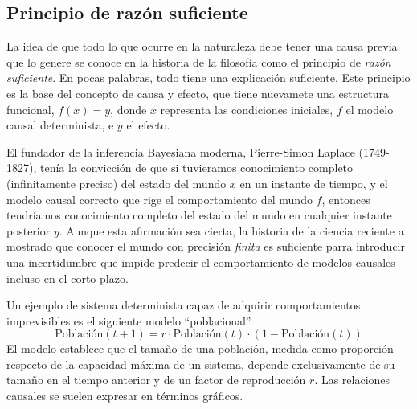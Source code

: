 \documentclass[a4paper,10pt]{book}
\theoremstyle{definition}
\begin{document}
\subsection{Principio de raz\'on suficiente}

La idea de que todo lo que ocurre en la naturaleza debe tener una causa previa que lo genere se conoce en la historia de la filosof\'ia como el principio de \emph{raz\'on suficiente}.
%
En pocas palabras, todo tiene una explicaci\'on suficiente.
%
Este principio es la base del concepto de causa y efecto, que tiene nuevamete una estructura funcional, $f(x) = y$, donde $x$ representa las condiciones iniciales, $f$ el modelo causal determinista, e $y$ el efecto.


El fundador de la inferencia Bayesiana moderna, Pierre-Simon Laplace (1749-1827), ten\'ia la convicci\'on de que si tuvieramos conocimiento completo (infinitamente preciso) del estado del mundo $x$ en un instante de tiempo, y el modelo causal correcto que rige el comportamiento del mundo $f$, entonces tendr\'iamos conocimiento completo del estado del mundo en cualquier instante posterior $y$.
%
Aunque esta afirmaci\'on sea cierta, la historia de la ciencia reciente a mostrado que conocer el mundo con precisi\'on \emph{finita} es suficiente parra introducir una incertidumbre que impide predecir el comportamiento de modelos causales incluso en el corto plazo.


Un ejemplo de sistema determinista capaz de adquirir comportamientos imprevisibles es el siguiente modelo ``poblacional''.
%
\begin{equation}
 \text{Poblaci\'on}(t+1) = r \cdot \text{Poblaci\'on}(t)\cdot (1-\text{Poblaci\'on}(t))
\end{equation}
%
El modelo establece que el tama\~no de una poblaci\'on, medida como proporci\'on respecto de la capacidad m\'axima de un sistema, depende exclusivamente de su tama\~no en el tiempo anterior y de un factor de reproducci\'on $r$.
%
Las relaciones causales se suelen expresar en t\'erminos gr\'aficos.
\end{document}
